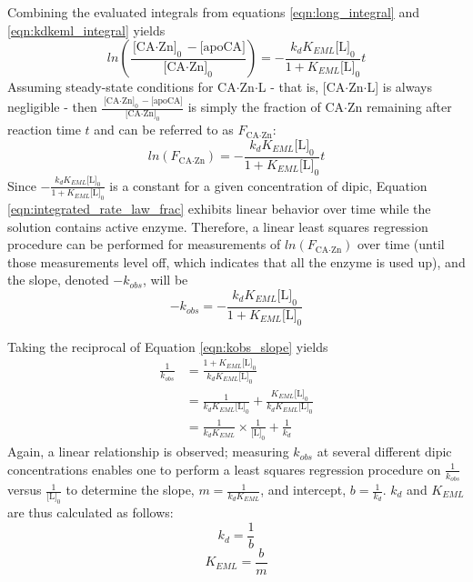 Combining the evaluated integrals from equations \eqref{eqn:long_integral} and \eqref{eqn:kdkeml_integral} yields
\begin{equation}\label{eqn:integrated_rate_law}
ln \left( \frac{\text{[CA$\cdot$Zn]}_0 - \text{[apoCA]}}{\text{[CA$\cdot$Zn]}_0} \right)
=
-\frac{k_{d}K_{EML}\text{[L]}_0}{1+K_{EML}\text{[L]}_0}t
\end{equation}
Assuming steady-state conditions for CA$\cdot$Zn$\cdot$L - that is, [CA$\cdot$Zn$\cdot$L] is always negligible - then $\frac{\text{[CA$\cdot$Zn]}_0 - \text{[apoCA]}}{\text{[CA$\cdot$Zn]}_0}$ is simply the fraction of CA$\cdot$Zn remaining after reaction time $t$ and can be referred to as $F_\text{CA$\cdot$Zn}$:
\begin{equation}\label{eqn:integrated_rate_law_frac}
ln \left( F_\text{CA$\cdot$Zn} \right)
=
-\frac{k_{d}K_{EML}\text{[L]}_0}{1+K_{EML}\text{[L]}_0}t
\end{equation}
Since $-\frac{k_{d}K_{EML}\text{[L]}_0}{1+K_{EML}\text{[L]}_0}$ is a constant for a given concentration of dipic, Equation \eqref{eqn:integrated_rate_law_frac} exhibits linear behavior over time while the solution contains active enzyme. Therefore, a linear least squares regression procedure can be performed for measurements of $ln \left( F_\text{CA$\cdot$Zn} \right)$ over time (until those measurements level off, which indicates that all the enzyme is used up), and the slope, denoted $-k_{obs}$, will be
\begin{equation}\label{eqn:kobs_slope}
-k_{obs}
=
-\frac{k_{d}K_{EML}\text{[L]}_0}{1+K_{EML}\text{[L]}_0}
\end{equation}

Taking the reciprocal of Equation \eqref{eqn:kobs_slope} yields
\begin{equation}\label{eqn:kobs_slope_reciprocal}
\begin{split}
\frac{1}{k_{obs}}
&=
\frac{1+K_{EML}\text{[L]}_0}{k_{d}K_{EML}\text{[L]}_0} \\
&= \frac{1}{k_{d}K_{EML}\text{[L]}_0} + \frac{K_{EML}\text{[L]}_0}{k_{d}K_{EML}\text{[L]}_0} \\
&= \frac{1}{k_{d}K_{EML}} \times \frac{1}{\text{[L]}_0} + \frac{1}{k_{d}}
\end{split}
\end{equation}
Again, a linear relationship is observed; measuring $k_{obs}$ at several different dipic concentrations enables one to perform a least squares regression procedure on $\frac{1}{k_{obs}}$ versus $\frac{1}{\text{[L]}_0}$ to determine the slope, $m=\frac{1}{k_{d}K_{EML}}$, and intercept, $b=\frac{1}{k_{d}}$. $k_d$ and $K_{EML}$ are thus calculated as follows:
\begin{equation}\label{eqn:calculating_kd}
k_d=\frac{1}{b}
\end{equation}
\begin{equation}\label{eqn:calculating_keml}
K_{EML}=\frac{b}{m}
\end{equation}


